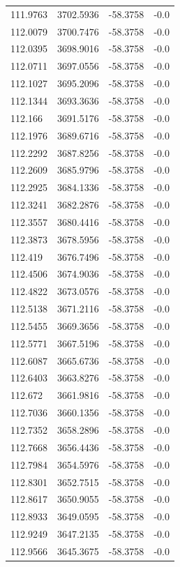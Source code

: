 \begin{table}[H]
\begin{tabular}{llll}
111.9763 & 3702.5936 & -58.3758 & -0.0 \\
112.0079 & 3700.7476 & -58.3758 & -0.0 \\
112.0395 & 3698.9016 & -58.3758 & -0.0 \\
112.0711 & 3697.0556 & -58.3758 & -0.0 \\
112.1027 & 3695.2096 & -58.3758 & -0.0 \\
112.1344 & 3693.3636 & -58.3758 & -0.0 \\
112.166 & 3691.5176 & -58.3758 & -0.0 \\
112.1976 & 3689.6716 & -58.3758 & -0.0 \\
112.2292 & 3687.8256 & -58.3758 & -0.0 \\
112.2609 & 3685.9796 & -58.3758 & -0.0 \\
112.2925 & 3684.1336 & -58.3758 & -0.0 \\
112.3241 & 3682.2876 & -58.3758 & -0.0 \\
112.3557 & 3680.4416 & -58.3758 & -0.0 \\
112.3873 & 3678.5956 & -58.3758 & -0.0 \\
112.419 & 3676.7496 & -58.3758 & -0.0 \\
112.4506 & 3674.9036 & -58.3758 & -0.0 \\
112.4822 & 3673.0576 & -58.3758 & -0.0 \\
112.5138 & 3671.2116 & -58.3758 & -0.0 \\
112.5455 & 3669.3656 & -58.3758 & -0.0 \\
112.5771 & 3667.5196 & -58.3758 & -0.0 \\
112.6087 & 3665.6736 & -58.3758 & -0.0 \\
112.6403 & 3663.8276 & -58.3758 & -0.0 \\
112.672 & 3661.9816 & -58.3758 & -0.0 \\
112.7036 & 3660.1356 & -58.3758 & -0.0 \\
112.7352 & 3658.2896 & -58.3758 & -0.0 \\
112.7668 & 3656.4436 & -58.3758 & -0.0 \\
112.7984 & 3654.5976 & -58.3758 & -0.0 \\
112.8301 & 3652.7515 & -58.3758 & -0.0 \\
112.8617 & 3650.9055 & -58.3758 & -0.0 \\
112.8933 & 3649.0595 & -58.3758 & -0.0 \\
112.9249 & 3647.2135 & -58.3758 & -0.0 \\
112.9566 & 3645.3675 & -58.3758 & -0.0 \\

\end{tabular}
\end{table}
